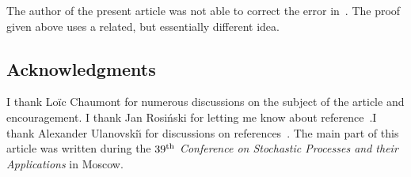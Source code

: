The author of the present article was not able to correct the error in~\cite{bib:u94}. The proof given above uses a related, but essentially different idea.



\subsection*{Acknowledgments}
I thank Lo\"ic Chaumont for numerous discussions on the subject of the article and encouragement. I thank Jan Rosiński for letting me know about reference~\cite{bib:ou90}.\linebreak I thank Alexander Ulanovski\u{\i} for discussions on references~\cite{bib:ou90,bib:u94}. The main part of this article was written during the \emph{$39^{\rm th}$ Conference on Stochastic Processes and their Applications} in Moscow.



